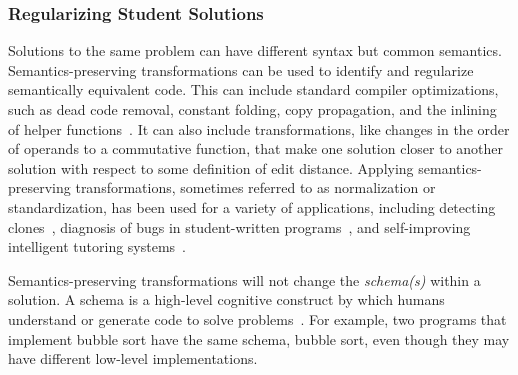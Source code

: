 
\subsubsection{Regularizing Student Solutions}


Solutions to the same problem can have different syntax but common semantics. Semantics-preserving transformations can be used to identify and regularize semantically equivalent code. This can include standard compiler optimizations, such as dead code removal, constant folding, copy propagation, and the inlining of helper functions~\cite{rivers2015data}. It can also include transformations, like changes in the order of operands to a commutative function, that make one solution closer to another solution with respect to some definition of edit distance. Applying semantics-preserving transformations, sometimes referred to as normalization or standardization, has been used for a variety of applications, including detecting clones~\cite{baxter,CCFinder}, diagnosis of bugs in student-written programs~\cite{xutransformation}, and self-improving intelligent tutoring systems~\cite{rivers2015data}. 

Semantics-preserving transformations will not change the {\it schema(s)} within a solution. A schema is a high-level cognitive construct by which humans understand or generate code to solve problems~\cite{Soloway1984}. For example, two programs that implement bubble sort have the same schema, bubble sort, even though they may have different low-level implementations. 

